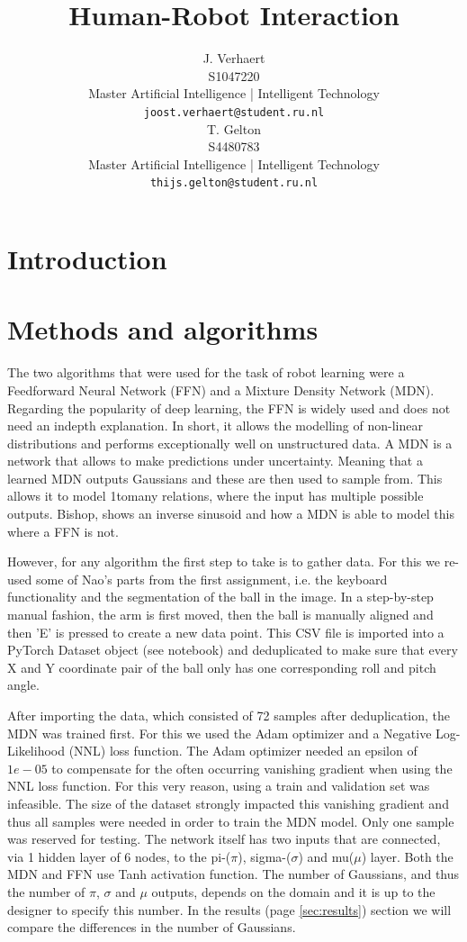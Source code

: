 \documentclass{article}
\title{Human-Robot Interaction}
\date{}
\author{
    J. Verhaert \\
    S1047220\\
    Master Artificial Intelligence | Intelligent Technology \\
    \texttt{joost.verhaert@student.ru.nl} \\
    \And
    T. Gelton \\
    S4480783\\
    Master Artificial Intelligence | Intelligent Technology \\
    \texttt{thijs.gelton@student.ru.nl} \\
}
\begin{document}
    \maketitle
    \pagebreak


    \section{Introduction}\label{sec:introduction}


    \section{Methods and algorithms}\label{sec:methods-and-algorithms}
    The two algorithms that were used for the task of robot learning were a Feedforward Neural Network (FFN) and a Mixture Density Network (MDN).
    Regarding the popularity of deep learning, the FFN is widely used and does not need an in\-depth explanation.
    In short, it allows the modelling of non-linear distributions and performs exceptionally well on unstructured data.
    A MDN is a network that allows to make predictions under uncertainty.
    Meaning that a learned MDN outputs Gaussians and these are then used to sample from.
    This allows it to model 1\-to\-many relations, where the input has multiple possible outputs.
    Bishop\cite{bishop1994mixture}, shows an inverse sinusoid and how a MDN is able to model this where a FFN is not.

    However, for any algorithm the first step to take is to gather data.
    For this we re-used some of Nao's parts from the first assignment, i.e. the keyboard functionality and the segmentation of the ball in the image.
    In a step-by-step manual fashion, the arm is first moved, then the ball is manually aligned and then 'E' is pressed to create a new data point.
    This CSV file is imported into a PyTorch Dataset object (see notebook) and deduplicated to make sure that every X and Y coordinate pair of the ball only has one corresponding roll and pitch angle.

    After importing the data, which consisted of 72 samples after deduplication, the MDN was trained first.
    For this we used the Adam optimizer and a Negative Log-Likelihood (NNL) loss function.
    The Adam optimizer needed an epsilon of $1e-05$ to compensate for the often occurring vanishing gradient when using the NNL loss function.
    For this very reason, using a train and validation set was infeasible. 
    The size of the dataset strongly impacted this vanishing gradient and thus all samples were needed in order to train the MDN model.   
    Only one sample was reserved for testing.
    The network itself has two inputs that are connected, via 1 hidden layer of 6 nodes, to the pi-($\pi$), sigma-($\sigma$) and mu($\mu$) layer.
    Both the MDN and FFN use Tanh activation function.
    The number of Gaussians, and thus the number of $\pi$, $\sigma$ and $\mu$ outputs, depends on the domain and it is up to the designer to specify this number.
    In the results (page \ref{sec:results}) section we will compare the differences in the number of Gaussians.
\end{document}

